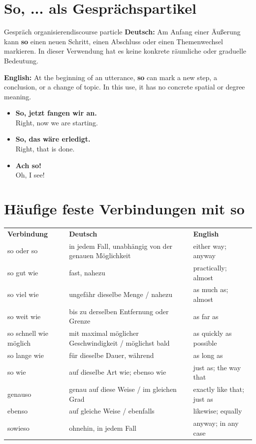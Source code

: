 \documentclass[a4paper,11pt]{article}
\newcommand{\GermanText}[1]{\textbf{Deutsch: }#1\par}
\newcommand{\EnglishText}[1]{{\small\color{SoftGray}\textbf{English: }#1\par}}
\newcommand{\ExampleItem}[2]{\item \textbf{#1}\\{\small\color{SoftGray}#2}}
\begin{document}
    \section{\glqq So, ...\grqq{} als Gesprächspartikel}

        \begin{grammarentry}{Gespräch organisieren}{discourse particle}
            \GermanText{Am Anfang einer Äußerung kann \textbf{so} einen neuen Schritt, einen Abschluss oder einen Themenwechsel markieren. In dieser Verwendung hat es keine konkrete räumliche oder graduelle Bedeutung.}
            \EnglishText{At the beginning of an utterance, \textbf{so} can mark a new step, a conclusion, or a change of topic. In this use, it has no concrete spatial or degree meaning.}
        \end{grammarentry}

        \begin{exbox}
            \begin{itemize}
                \ExampleItem{So, jetzt fangen wir an.}{Right, now we are starting.}
                \ExampleItem{So, das wäre erledigt.}{Right, that is done.}
                \ExampleItem{Ach so!}{Oh, I see!}
            \end{itemize}
        \end{exbox}

    \section{Häufige feste Verbindungen mit \glqq so\grqq}

        \begin{longtable}{p{3.5cm}|p{5.0cm}|p{5.0cm}}
            \rowcolor{HeaderBlueDark}
            \color{white}\textbf{Verbindung} &
            \color{white}\textbf{Deutsch} &
            \color{white}\textbf{English} \\
            so oder so & in jedem Fall, unabhängig von der genauen Möglichkeit & either way; anyway \\
            so gut wie & fast, nahezu & practically; almost \\
            so viel wie & ungefähr dieselbe Menge / nahezu & as much as; almost \\
            so weit wie & bis zu derselben Entfernung oder Grenze & as far as \\
            so schnell wie möglich & mit maximal möglicher Geschwindigkeit / möglichst bald & as quickly as possible \\
            so lange wie & für dieselbe Dauer, während & as long as \\
            so wie & auf dieselbe Art wie; ebenso wie & just as; the way that \\
            genauso & genau auf diese Weise / im gleichen Grad & exactly like that; just as \\
            ebenso & auf gleiche Weise / ebenfalls & likewise; equally \\
            sowieso & ohnehin, in jedem Fall & anyway; in any case \\
        \end{longtable}
\end{document}
